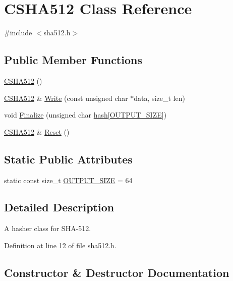 \hypertarget{class_c_s_h_a512}{}\section{C\+S\+H\+A512 Class Reference}
\label{class_c_s_h_a512}


{\ttfamily \#include $<$sha512.\+h$>$}

\subsection*{Public Member Functions}
\begin{DoxyCompactItemize}
\item 
\hyperlink{class_c_s_h_a512_ad9e6d4dbaa01a2e35461a7a58d9008f4}{C\+S\+H\+A512} ()
\item 
\hyperlink{class_c_s_h_a512}{C\+S\+H\+A512} \& \hyperlink{class_c_s_h_a512_aefd8260a2c205f11d44670ae68f1aff0}{Write} (const unsigned char $\ast$data, size\+\_\+t len)
\item 
void \hyperlink{class_c_s_h_a512_aef4627aae19eeeb54bf02ea7b222b688}{Finalize} (unsigned char \hyperlink{cache_8cc_a11ecb029164e055f28f4123ce3748862}{hash}\mbox{[}\hyperlink{class_c_s_h_a512_a2de748ad386b21314f9990029d41dd53}{O\+U\+T\+P\+U\+T\+\_\+\+S\+I\+Z\+E}\mbox{]})
\item 
\hyperlink{class_c_s_h_a512}{C\+S\+H\+A512} \& \hyperlink{class_c_s_h_a512_a6c469e0a6d1988cb255acf15afc66c2e}{Reset} ()
\end{DoxyCompactItemize}
\subsection*{Static Public Attributes}
\begin{DoxyCompactItemize}
\item 
static const size\+\_\+t \hyperlink{class_c_s_h_a512_a2de748ad386b21314f9990029d41dd53}{O\+U\+T\+P\+U\+T\+\_\+\+S\+I\+Z\+E} = 64
\end{DoxyCompactItemize}


\subsection{Detailed Description}
A hasher class for S\+H\+A-\/512. 

Definition at line 12 of file sha512.\+h.



\subsection{Constructor \& Destructor Documentation}
\hypertarget{class_c_s_h_a512_ad9e6d4dbaa01a2e35461a7a58d9008f4}{}
